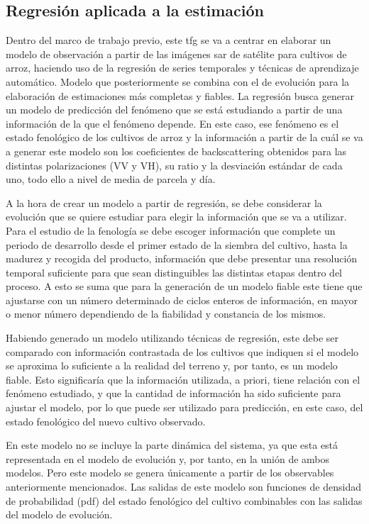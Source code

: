 \subsection{Regresión aplicada a la estimación}
\par Dentro del marco de trabajo previo, este \gls{tfg} se va a centrar en elaborar un modelo de observación a partir de las imágenes \gls{sar} de satélite para cultivos de arroz, haciendo uso de la regresión de series temporales y técnicas de aprendizaje automático. Modelo que posteriormente se combina con el de evolución para la elaboración de estimaciones más completas y fiables. La regresión busca generar un modelo de predicción del fenómeno que se está estudiando a partir de una información de la que el fenómeno depende. En este caso, ese fenómeno es el estado fenológico de los cultivos de arroz y la información a partir de la cuál se va a generar este modelo son los coeficientes de backscattering obtenidos para las distintas polarizaciones (VV y VH), su ratio y la desviación estándar de cada uno, todo ello a nivel de media de parcela y día.
\\
\par A la hora de crear un modelo a partir de regresión, se debe considerar la evolución que se quiere estudiar para elegir la información que se va a utilizar. Para el estudio de la fenología se debe escoger información que complete un periodo de desarrollo desde el primer estado de la siembra del cultivo, hasta la madurez y recogida del producto, información que debe presentar una resolución temporal suficiente para que sean distinguibles las distintas etapas dentro del proceso. A esto se suma que para la generación de un modelo fiable este tiene que ajustarse con un número determinado de ciclos enteros de información, en mayor o menor número dependiendo de la fiabilidad y constancia de los mismos. 
\\
\par Habiendo generado un modelo utilizando técnicas de regresión, este debe ser comparado con información contrastada de los cultivos que indiquen si el modelo se aproxima lo suficiente a la realidad del terreno y, por tanto, es un modelo fiable. Esto significaría que la información utilizada, a priori, tiene relación con el fenómeno estudiado, y que la cantidad de información ha sido suficiente para ajustar el modelo, por lo que puede ser utilizado para predicción, en este caso, del estado fenológico del nuevo cultivo observado. 
\\
\par En este modelo no se incluye la parte dinámica del sistema, ya que esta está representada en el modelo de evolución y, por tanto, en la unión de ambos modelos. Pero este modelo se genera únicamente a partir de los observables anteriormente mencionados. Las salidas de este modelo son funciones de densidad de probabilidad (\gls{pdf}) del estado fenológico del cultivo combinables con las salidas del modelo de evolución. 
